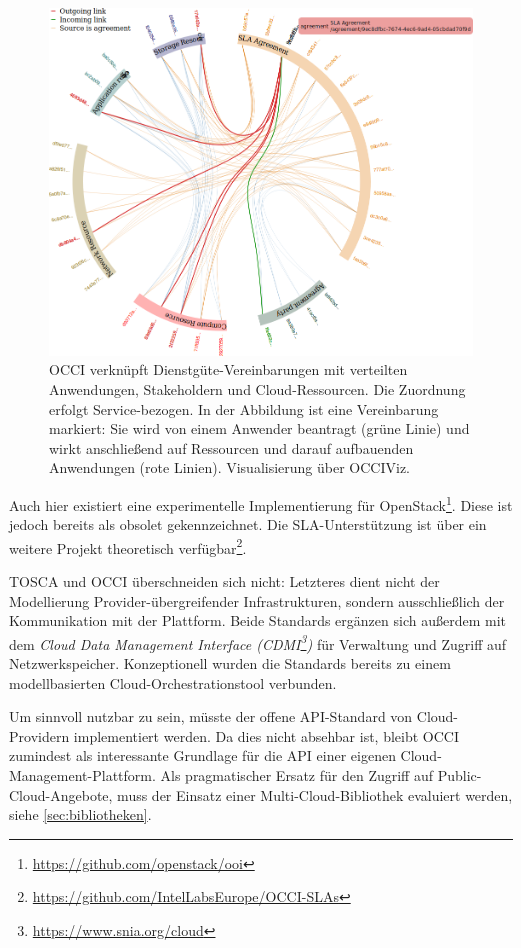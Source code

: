 \begin{description}
	\begin{figure}[h]
		\centering
		\includegraphics[width=\textwidth]{images/OCCI-relations.png}
		\caption{OCCI verknüpft Dienstgüte-Vereinbarungen mit verteilten Anwendungen, Stakeholdern und Cloud-Ressourcen. Die Zuordnung erfolgt Service-bezogen. In der Abbildung ist eine Vereinbarung markiert: Sie wird von einem Anwender beantragt (grüne Linie) und wirkt anschließend auf Ressourcen und darauf aufbauenden Anwendungen (rote Linien). Visualisierung über OCCIViz.}
		\label{fig:occi}
	\end{figure}
	
	Auch hier existiert eine experimentelle Implementierung für OpenStack\footnote{\url{https://github.com/openstack/ooi}}. Diese ist jedoch bereits als obsolet gekennzeichnet. Die SLA-Unterstützung ist über ein weitere Projekt theoretisch verfügbar\footnote{\url{https://github.com/IntelLabsEurope/OCCI-SLAs}}.
	
	TOSCA und OCCI überschneiden sich nicht: Letzteres dient nicht der Modellierung Provider-übergreifender Infrastrukturen, sondern ausschließlich der Kommunikation mit der Plattform. Beide Standards ergänzen sich außerdem mit dem \emph{Cloud Data Management Interface (CDMI\footnote{\url{https://www.snia.org/cloud}})} für Verwaltung und Zugriff auf Netzwerkspeicher. Konzeptionell wurden die Standards bereits zu einem modellbasierten Cloud-Orchestrationstool verbunden.
	
	Um sinnvoll nutzbar zu sein, müsste der offene API-Standard von Cloud-Providern implementiert werden. Da dies nicht absehbar ist, bleibt OCCI zumindest als interessante Grundlage für die API einer eigenen Cloud-Management-Plattform. Als pragmatischer Ersatz für den Zugriff auf Public-Cloud-Angebote, muss der Einsatz einer Multi-Cloud-Bibliothek evaluiert werden, siehe \autoref{sec:bibliotheken}.		
	
\end{description}

